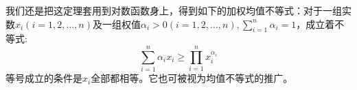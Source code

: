 我们还是把这定理套用到对数函数身上，得到如下的加权均值不等式：对于一组实数$x_i(i=1,2,\ldots,n)$及一组权值$\alpha_i>0(i=1,2,\ldots,n),\sum_{i=1}^n\alpha_i=1$，成立着不等式:
\begin{equation}
  \label{eq:poly-neq-for-mean-with-weight}
 \sum_{i=1}^n\alpha_i x_i \geqslant \prod_{i=1}^nx_i^{\alpha_i} 
\end{equation}
等号成立的条件是$x_i$全部都相等。它也可被视为均值不等式的推广。



